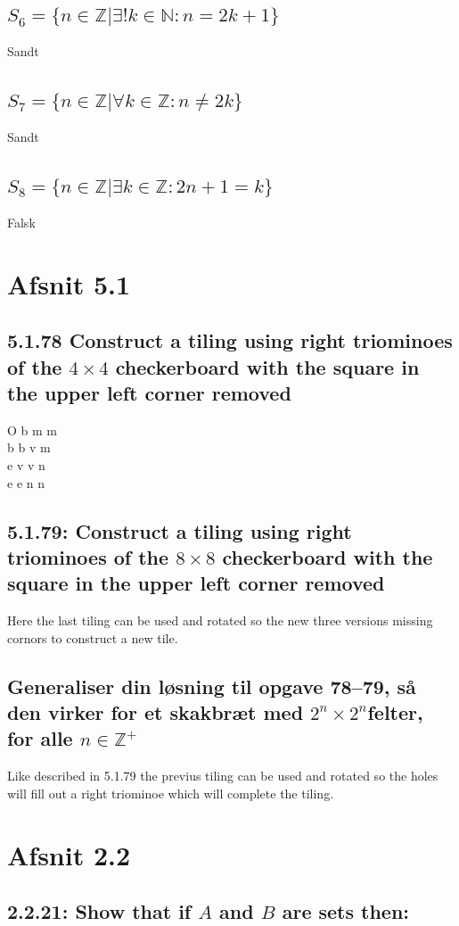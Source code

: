 \documentclass[12pt, a4paper]{report}
\begin{document}
					\subsection{$S_6=\{n\in\mathbb{Z}|\exists!k\in\mathbb{N}:n=2k+1\}$}
						Sandt
					\subsection{$S_7=\{n\in\mathbb{Z}|\forall k \in \mathbb{Z}: n\neq 2k\}$}
						Sandt
					\subsection{$S_8=\{n\in\mathbb{Z}|\exists k\in \mathbb{Z}:2n+1=k\}$}
						Falsk
			\setcounter{section}{0}
			\section{Afsnit 5.1}
				\setcounter{subsection}{77}
				\subsection{5.1.78 Construct a tiling using right triominoes of the $4 \times 4$ checkerboard with the square in the upper left corner removed}
					O b m m\\
					b b v m\\
					e v v n\\
					e e n n
				\subsection{5.1.79: Construct a tiling using right triominoes of the $8 \times 8$ checkerboard with the square in the upper left corner removed}
					Here the last tiling can be used and rotated so the new three versions missing cornors to construct a new tile.
				\subsection{Generaliser din løsning til opgave 78–79, så den virker for et skakbræt med $2^n\times 2^n$felter, for alle $n\in \mathbb{Z}^+$}
					Like described in 5.1.79 the previus tiling can be used and rotated so the holes will fill out a right triominoe which will complete the tiling.
			\section{Afsnit 2.2}
				\setcounter{subsection}{20}
				\subsection{2.2.21: Show that if $A$ and $B$ are sets then:}
\end{document}

